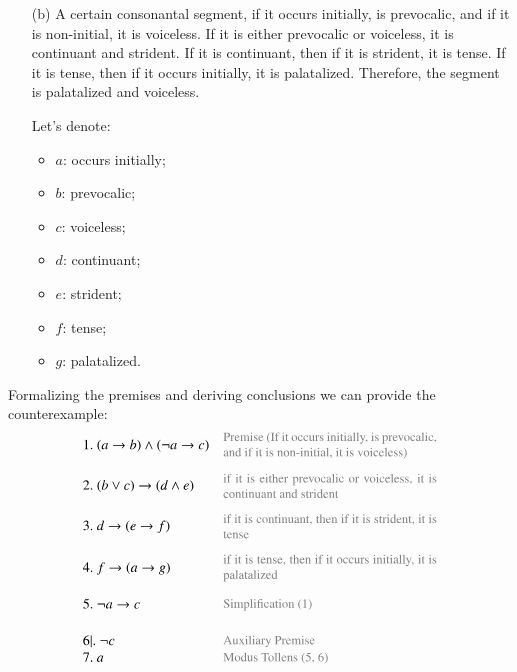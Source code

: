 \documentclass[12pt]{report}
\begin{document}
\begin{problem}{}
\begin{itemize}
            \item[(b)] A certain consonantal segment, if it occurs initially, is prevocalic, and if it is non-initial, it is voiceless. If it is either prevocalic or voiceless, it is continuant and strident. If it is continuant, then if it is strident, it is tense. If it is tense, then if it occurs initially, it is palatalized. Therefore, the segment is palatalized and voiceless. 
            \par
            Let's denote:
            \begin{itemize}
                \item $a$: occurs initially;
                \item $b$: prevocalic;
                \item $c$: voiceless;
                \item $d$: continuant;
                \item $e$: strident;
                \item $f$: tense;
                \item $g$: palatalized.
            \end{itemize}
        \end{itemize}
        Formalizing the premises and deriving conclusions we can provide the counterexample:
        \[
            \begin{array}{lr}
                1.\ (a \rightarrow b) \wedge (\neg a \rightarrow c) & \parbox{15.3em}{\small \color{gray} Premise (If it occurs initially, is prevocalic, and if it is non-initial, it is voiceless)} \\[0.5cm]
                2.\ (b \vee c) \rightarrow (d \wedge e) & \parbox{15.3em}{\small \color{gray} if it is either prevocalic or voiceless, it is continuant and strident}\\[0.5cm]
                3.\ d \rightarrow (e \rightarrow f) & \parbox{15.3em}{\small \color{gray} if it is continuant, then if it is strident, it is tense}\\[0.5cm]
                4.\ f \rightarrow (a \rightarrow g) & \parbox{15.3em}{\small \color{gray} if it is tense, then if it occurs initially, it is palatalized} \\[0.5cm]
                5.\ \neg a \rightarrow c & \parbox{15.3em}{\small \color{gray} Simplification (1)}\\[0.5cm]
                6|.\ \neg c & \parbox{15.3em}{\small \color{gray} Auxiliary Premise}\\
                7.\ a & \parbox{15.3em}{\small \color{gray} Modus Tollens (5, 6)}\\

\end{array}\]
\end{problem}
\end{document}
